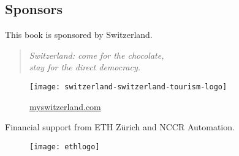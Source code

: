 
\vfill
\subsection{Sponsors}

This book is sponsored by Switzerland.

\begin{quote}\centering
    \itshape
    Switzerland: come for the chocolate,\\
    stay for the direct democracy.
\end{quote}

\begin{figure}[h]
    \centering
    \texttt{[image: switzerland-switzerland-tourism-logo]}

    \href{http://myswitzerland.com}{myswitzerland.com}
\end{figure}


Financial support from ETH Zürich and NCCR Automation.
\begin{figure}[h]
    \centering
    \texttt{[image: ethlogo]}
\end{figure} 

\vfill